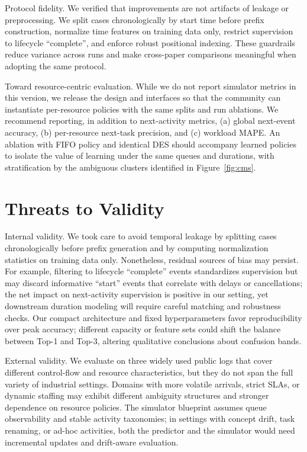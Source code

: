 \documentclass{article}
\theoremstyle{plain}
\theoremstyle{definition}
\theoremstyle{remark}
\begin{document}
	Protocol fidelity. We verified that improvements are not artifacts of leakage or preprocessing. We split cases chronologically by start time before prefix construction, normalize time features on training data only, restrict supervision to lifecycle ``complete'', and enforce robust positional indexing. These guardrails reduce variance across runs and make cross-paper comparisons meaningful when adopting the same protocol.
	
	Toward resource-centric evaluation. While we do not report simulator metrics in this version, we release the design and interfaces so that the community can instantiate per-resource policies with the same splits and run ablations. We recommend reporting, in addition to next-activity metrics, (a) global next-event accuracy, (b) per-resource next-task precision, and (c) workload MAPE. An ablation with FIFO policy and identical DES should accompany learned policies to isolate the value of learning under the same queues and durations, with stratification by the ambiguous clusters identified in Figure~\ref{fig:cms}.
	
	\section{Threats to Validity}
	\label{sec:threats}
	Internal validity. We took care to avoid temporal leakage by splitting cases chronologically before prefix generation and by computing normalization statistics on training data only. Nonetheless, residual sources of bias may persist. For example, filtering to lifecycle ``complete'' events standardizes supervision but may discard informative ``start'' events that correlate with delays or cancellations; the net impact on next-activity supervision is positive in our setting, yet downstream duration modeling will require careful matching and robustness checks. Our compact architecture and fixed hyperparameters favor reproducibility over peak accuracy; different capacity or feature sets could shift the balance between Top-1 and Top-3, altering qualitative conclusions about confusion bands.
	
	External validity. We evaluate on three widely used public logs that cover different control-flow and resource characteristics, but they do not span the full variety of industrial settings. Domains with more volatile arrivals, strict SLAs, or dynamic staffing may exhibit different ambiguity structures and stronger dependence on resource policies. The simulator blueprint assumes queue observability and stable activity taxonomies; in settings with concept drift, task renaming, or ad-hoc activities, both the predictor and the simulator would need incremental updates and drift-aware evaluation.
	
\end{document}
